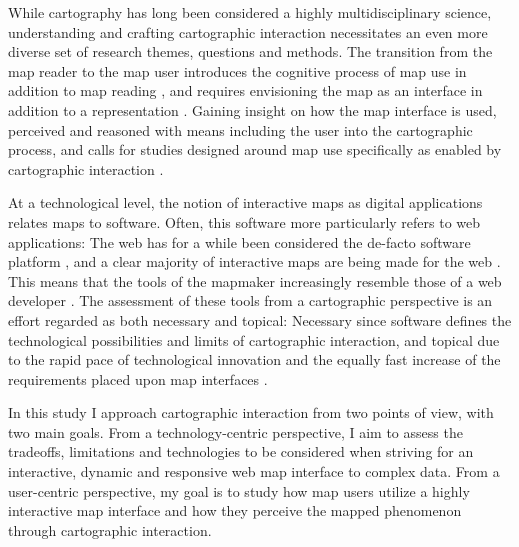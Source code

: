 While cartography has long been considered a highly multidisciplinary science,
understanding and crafting cartographic interaction necessitates an even
more diverse set of research themes, questions and methods.
The transition from the map reader to the map user
introduces the cognitive process of map use in addition to map reading
\parencite{mac2015, liu2010},
and requires envisioning the map as an interface in addition to a representation
\parencite{rot2013b}.
Gaining insight on how the map interface is used, perceived and reasoned with
means including the user into the cartographic process,
and calls for studies designed around map use specifically as enabled by cartographic interaction
\parencite{rot2017}.

At a technological level,
the notion of interactive maps as digital applications relates maps to software.
Often, this software more particularly refers to web applications:
The web has for a while been considered the de-facto software platform \parencite{tai2017, mik2019},
and a clear majority of interactive maps are being made for the web \parencite{vee2017}.
This means that the tools of the mapmaker
increasingly resemble those of a web developer \parencite{rot2021}.
The assessment of these tools from a cartographic perspective is
an effort regarded as both necessary and topical:
Necessary since software defines the technological possibilities and limits
of cartographic interaction,
and topical due to the rapid pace of technological innovation
and the equally fast increase of the requirements placed upon map interfaces
\parencite{rot2014, rot2021}.

In this study I approach cartographic interaction from two points of view,
with two main goals.
From a technology-centric perspective,
I aim to assess the tradeoffs, limitations and technologies to be considered when
striving for an interactive, dynamic and responsive web map interface to complex data.
From a user-centric perspective,
my goal is to study how
map users utilize a highly interactive map interface
and how they perceive the mapped phenomenon
through cartographic interaction.


